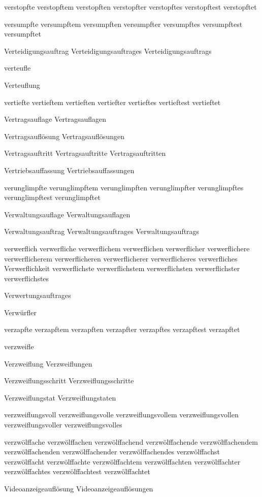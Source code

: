 verstopfte
verstopftem
verstopften
verstopfter
verstopftes
verstopftest
verstopftet

versumpfte
versumpftem
versumpften
versumpfter
versumpftes
versumpftest
versumpftet

Verteidigungsauftrag
Verteidigungsauftrages
Verteidigungsauftrags

verteufle

Verteuflung

vertiefte
vertieftem
vertieften
vertiefter
vertieftes
vertieftest
vertieftet

Vertragsauflage
Vertragsauflagen

Vertragsauflösung
Vertragsauflösungen

Vertragsauftritt
Vertragsauftritte
Vertragsauftritten

Vertriebsauffassung
Vertriebsauffassungen

verunglimpfte
verunglimpftem
verunglimpften
verunglimpfter
verunglimpftes
verunglimpftest
verunglimpftet

Verwaltungsauflage
Verwaltungsauflagen

Verwaltungsauftrag
Verwaltungsauftrages
Verwaltungsauftrags

verwerflich
verwerfliche
verwerflichem
verwerflichen
verwerflicher
verwerflichere
verwerflicherem
verwerflicheren
verwerflicherer
verwerflicheres
verwerfliches
Verwerflichkeit
verwerflichste
verwerflichstem
verwerflichsten
verwerflichster
verwerflichstes

Verwertungsauftrages

Verwürfler

verzapfte
verzapftem
verzapften
verzapfter
verzapftes
verzapftest
verzapftet

verzweifle

Verzweiflung
Verzweiflungen

Verzweiflungsschritt
Verzweiflungsschritte

Verzweiflungstat
Verzweiflungstaten

verzweiflungsvoll
verzweiflungsvolle
verzweiflungsvollem
verzweiflungsvollen
verzweiflungsvoller
verzweiflungsvolles

verzwölffache 
verzwölffachen 
verzwölffachend 
verzwölffachende 
verzwölffachendem 
verzwölffachenden 
verzwölffachender 
verzwölffachendes 
verzwölffachst 
verzwölffacht 
verzwölffachte 
verzwölffachtem 
verzwölffachten 
verzwölffachter 
verzwölffachtes 
verzwölffachtest 
verzwölffachtet

Videoanzeigeauflösung
Videoanzeigeauflösungen

